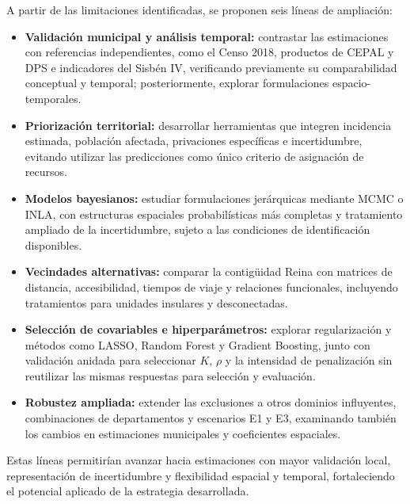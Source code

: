 A partir de las limitaciones identificadas, se proponen seis líneas de ampliación:

\begin{itemize}
\setlength{\itemsep}{3pt}

\item \textbf{Validación municipal y análisis temporal:} contrastar las estimaciones con referencias independientes, como el Censo 2018, productos de CEPAL y DPS e indicadores del Sisbén IV, verificando previamente su comparabilidad conceptual y temporal; posteriormente, explorar formulaciones espacio-temporales.

\item \textbf{Priorización territorial:} desarrollar herramientas que integren incidencia estimada, población afectada, privaciones específicas e incertidumbre, evitando utilizar las predicciones como único criterio de asignación de recursos.

\item \textbf{Modelos bayesianos:} estudiar formulaciones jerárquicas mediante MCMC o INLA, con estructuras espaciales probabilísticas más completas y tratamiento ampliado de la incertidumbre, sujeto a las condiciones de identificación disponibles.

\item \textbf{Vecindades alternativas:} comparar la contigüidad Reina con matrices de distancia, accesibilidad, tiempos de viaje y relaciones funcionales, incluyendo tratamientos para unidades insulares y desconectadas.

\item \textbf{Selección de covariables e hiperparámetros:} explorar regularización y métodos como LASSO, Random Forest y Gradient Boosting, junto con validación anidada para seleccionar $K$, $\rho$ y la intensidad de penalización sin reutilizar las mismas respuestas para selección y evaluación.

\item \textbf{Robustez ampliada:} extender las exclusiones a otros dominios influyentes, combinaciones de departamentos y escenarios E1 y E3, examinando también los cambios en estimaciones municipales y coeficientes espaciales.

\end{itemize}

Estas líneas permitirían avanzar hacia estimaciones con mayor validación local, representación de incertidumbre y flexibilidad espacial y temporal, fortaleciendo el potencial aplicado de la estrategia desarrollada.
